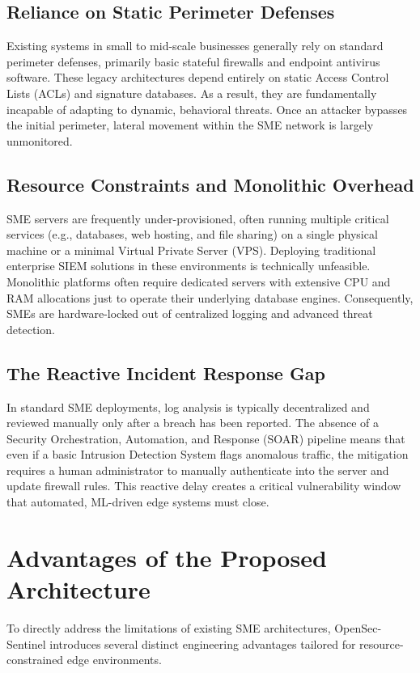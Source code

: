 \documentclass[12pt, a4paper]{report}
\begin{document}
	
	
	\subsection{Reliance on Static Perimeter Defenses}
	Existing systems in small to mid-scale businesses generally rely on standard perimeter defenses, primarily basic stateful firewalls and endpoint antivirus software. These legacy architectures depend entirely on static Access Control Lists (ACLs) and signature databases. As a result, they are fundamentally incapable of adapting to dynamic, behavioral threats. Once an attacker bypasses the initial perimeter, lateral movement within the SME network is largely unmonitored.
	
	\subsection{Resource Constraints and Monolithic Overhead}
	SME servers are frequently under-provisioned, often running multiple critical services (e.g., databases, web hosting, and file sharing) on a single physical machine or a minimal Virtual Private Server (VPS). Deploying traditional enterprise SIEM solutions in these environments is technically unfeasible. Monolithic platforms often require dedicated servers with extensive CPU and RAM allocations just to operate their underlying database engines. Consequently, SMEs are hardware-locked out of centralized logging and advanced threat detection.
	
	\subsection{The Reactive Incident Response Gap}
	In standard SME deployments, log analysis is typically decentralized and reviewed manually only after a breach has been reported. The absence of a Security Orchestration, Automation, and Response (SOAR) pipeline means that even if a basic Intrusion Detection System flags anomalous traffic, the mitigation requires a human administrator to manually authenticate into the server and update firewall rules. This reactive delay creates a critical vulnerability window that automated, ML-driven edge systems must close.
	
	\section{Advantages of the Proposed Architecture}
	To directly address the limitations of existing SME architectures, OpenSec-Sentinel introduces several distinct engineering advantages tailored for resource-constrained edge environments.
	
\end{document}
